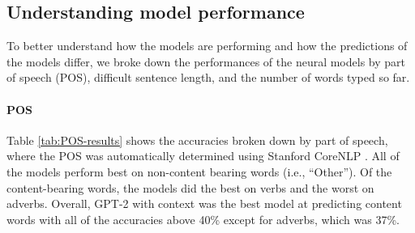 \documentclass[11pt,a4paper]{article}
\begin{document}
\begin{table}[t]
\centering
{}
\caption{\label{tab:context_information} Sample output for simplifying the difficult sentence ``\textit{Each pseudostem can produce a single bunch of bananas.}'' using GPT-2 with and without context.  ``Actual'' indicates the word that should be predicted.}
\vspace{-2mm}
\end{table}

\subsection{Understanding model performance}

To better understand how the models are performing and how the predictions of the models differ, we broke down the performances of the neural models by part of speech (POS), difficult sentence length, and the number of words typed so far.

\vspace{-1mm}
\paragraph{POS} Table \ref{tab:POS-results} shows the accuracies broken down by part of speech, where the POS was automatically determined using Stanford CoreNLP  \cite{manning2014corenlp}.  All of the models perform best on non-content bearing words (i.e., ``Other'').  Of the content-bearing words, the models did the best on verbs and the worst on adverbs.  Overall, GPT-2 with context was the best model at predicting content words with all of the accuracies above 40\% except for adverbs, which was 37\%.
\end{document}
